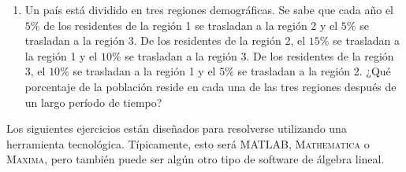 \begin{enumerate}
    \item Un país está dividido en tres regiones demográficas. Se sabe que cada año el $5\%$ de los residentes de la región 1 se trasladan a la región 2 y el $5\%$ se trasladan a la región 3. De los residentes de la región 2, el $15\%$ se trasladan a la región 1 y el $10\%$ se trasladan a la región 3. De los residentes de la región 3, el $10\%$ se trasladan a la región 1 y el $5\%$ se trasladan a la región 2. ¿Qué porcentaje de la población reside en cada una de las tres regiones después de un largo período de tiempo?
\end{enumerate}
Los siguientes ejercicios están diseñados para resolverse utilizando una herramienta tecnológica. Típicamente, esto será \textsc{MATLAB}, \textsc{Mathematica} o \textsc{Maxima}, pero también puede ser algún otro tipo de software de álgebra lineal.
